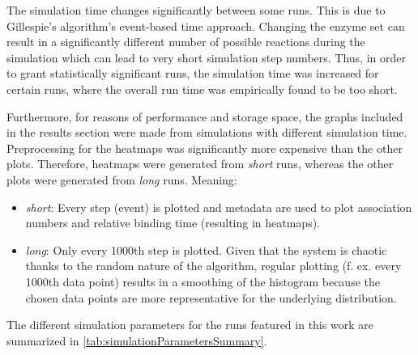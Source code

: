         The simulation time changes significantly between some runs. This is due to Gillespie's algorithm's event-based time approach. Changing the enzyme set can result in a significantly different number of possible reactions during the simulation which can lead to very short simulation step numbers. Thus, in order to grant statistically significant runs, the simulation time was increased for certain runs, where the overall run time was empirically found to be too short.

        Furthermore, for reasons of performance and storage space, the graphs included in the results section were made from simulations with different simulation time. Preprocessing for the heatmaps was significantly more expensive than the other plots. Therefore, heatmaps were generated from \textit{short} runs, whereas the other plots were generated from \textit{long} runs. Meaning:

        \begin{itemize}
            \item \textit{short}: Every step (event) is plotted and metadata are used to plot association numbers and relative binding time (resulting in heatmaps).
            \item \textit{long}: Only every 1000th step is plotted. Given that the system is chaotic thanks to the random nature of the algorithm, regular plotting (f. ex. every 1000th data point) results in a smoothing of the histogram because the chosen data points are more representative for the underlying distribution.
        \end{itemize}

        The different simulation parameters for the runs featured in this work are summarized in \ref{tab:simulationParametersSummary}.
%
%